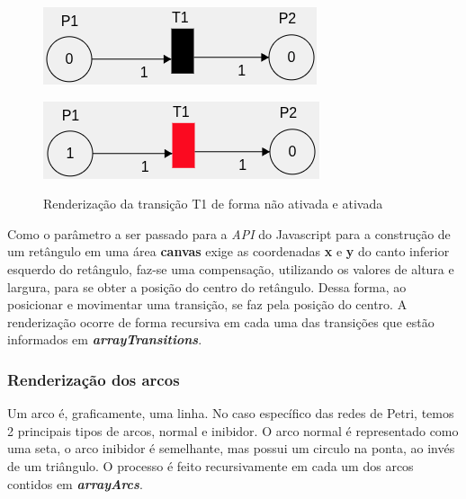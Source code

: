 \documentclass[
	12pt,				%
	openright,			%
	oneside,			%
	a4paper,			%
	english,			%
	brazil				%
	]{abntex2}
\begin{document}
\begin{figure}[ht]
	\label{fig:renderTransition}
	\centering
	\begin{minipage}{0.5\textwidth}
		\centering
		\includegraphics[scale=1]{figuras/transitionEnableFalse.png}
		\label{fig:renderTransitionEnableFalse}
	\end{minipage}
	\hfill
	\begin{minipage}{0.5\textwidth}
		\centering
		\includegraphics[scale=1]{figuras/transitionEnableTrue.png}
		\label{fig:renderTransitionEnableTrue}
	\end{minipage}
	\caption{Renderização da transição T1 de forma não ativada e ativada}
\end{figure}

Como o parâmetro a ser passado para a \textit{API} do Javascript para a construção de um retângulo em uma área \textbf{canvas} exige as coordenadas \textbf{x} e \textbf{y} do canto inferior esquerdo do retângulo, faz-se uma compensação, utilizando os valores de altura e largura, para se obter a posição do centro do retângulo. Dessa forma, ao posicionar e movimentar uma transição, se faz pela posição do centro.  A renderização ocorre de forma recursiva em cada uma das transições que estão informados em \textbf{\textit{arrayTransitions}}.

\subsubsection*{Renderização dos arcos}

Um arco é, graficamente, uma linha. No caso específico das redes de Petri, temos 2 principais tipos de arcos, normal e inibidor. O arco normal é representado como uma seta, o arco inibidor é semelhante, mas possui um circulo na ponta, ao invés de um triângulo. O processo é feito recursivamente em cada um dos arcos contidos em \textbf{\textit{arrayArcs}}.
\end{document}
